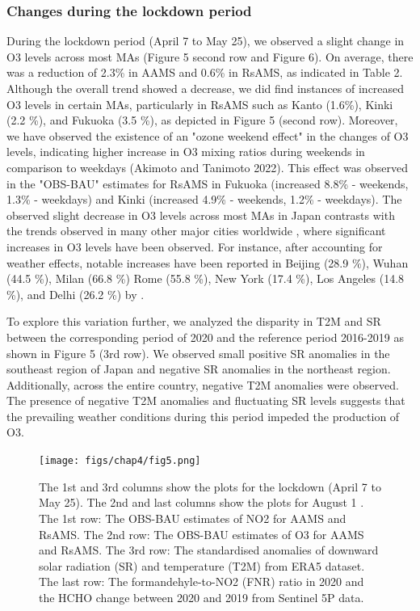 \subsubsection*{Changes during the lockdown period}
During the lockdown period (April 7 to May 25), we observed a slight change in O3 levels across most MAs (Figure 5 second row and Figure 6). On average, there was a reduction of 2.3\% in AAMS and 0.6\% in RsAMS, as indicated in Table 2. Although the overall trend showed a decrease, we did find instances of increased O3 levels in certain MAs, particularly in RsAMS such as Kanto (1.6\%), Kinki (2.2 \%), and Fukuoka (3.5 \%), as depicted in Figure 5 (second row). Moreover, we have observed the existence of an "ozone weekend effect" in the changes of O3 levels, indicating higher increase in O3 mixing ratios during weekends in comparison to weekdays (Akimoto and Tanimoto 2022). This effect was observed in the "OBS-BAU" estimates for RsAMS in Fukuoka (increased 8.8\% - weekends, 1.3\% - weekdays) and Kinki (increased 4.9\% - weekends, 1.2\% - weekdays).
The observed slight decrease in O3 levels across most MAs in Japan contrasts with the trends observed in many other major cities worldwide \citep{shi2021abrupt,grange2021covid}, where significant increases in O3 levels have been observed. For instance, after accounting for weather effects, notable increases have been reported in Beijing (28.9 \%), Wuhan (44.5 \%), Milan (66.8 \%) Rome (55.8 \%), New York (17.4 \%), Los Angeles (14.8 \%), and Delhi (26.2 \%) by \citep{shi2021abrupt}.\par
To explore this variation further, we analyzed the disparity in T2M and SR between the corresponding period of 2020 and the reference period 2016-2019 as shown in Figure 5 (3rd row). We observed small positive SR anomalies in the southeast region of Japan and negative SR anomalies in the northeast region. Additionally, across the entire country, negative T2M anomalies were observed. The presence of negative T2M anomalies and fluctuating SR levels suggests that the prevailing weather conditions during this period impeded the production of O3. \par

\begin{figure}[p]
    \centering
    \texttt{[image: figs/chap4/fig5.png]}
    \caption[NO2, O3, SR, T2M, FNR, and HCHO variations in 2020]{The 1st and 3rd columns show the plots for the lockdown (April 7 to May 25). The 2nd and last columns show the plots for August 1 . The 1st row: The OBS-BAU estimates of NO2 for AAMS and RsAMS. The 2nd row: The OBS-BAU estimates of O3 for AAMS and RsAMS. The 3rd row: The standardised anomalies of downward solar radiation (SR) and temperature (T2M) from ERA5 dataset. The last row: The formandehyle-to-NO2 (FNR) ratio in 2020 and the HCHO change between 2020 and 2019 from Sentinel 5P data.}
    \label{fig:chap4_fig5}
\end{figure}

